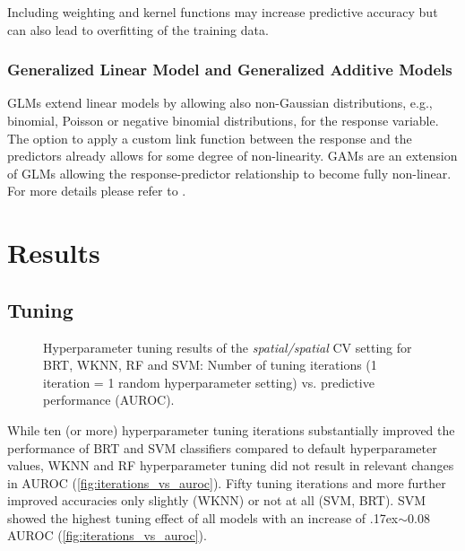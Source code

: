 \documentclass[review]{elsarticle}
\newcommand{\mytilde}{\raise.17ex\hbox{$\scriptstyle\mathtt{\sim}$}}
\begin{document}
Including weighting and kernel functions may increase predictive accuracy but can also lead to overfitting of the training data.

\subsubsection{Generalized Linear Model and Generalized Additive Models}

\label{subsec:gam}

\ac{GLM}s extend linear models by allowing also non-Gaussian distributions, e.g., binomial, Poisson or negative binomial distributions, for the response variable.
The option to apply a custom link function between the response and the predictors already allows for some degree of non-linearity.
\ac{GAM}s are an extension of \ac{GLM}s allowing the response-predictor relationship to become fully non-linear.
For more details please refer to \cite{Zuur2009, mgcv, James2013}.

\section{Results}

\subsection{Tuning}

\begin{figure} [t!]
	\begin{center}
		\caption[]{Hyperparameter tuning results of the \emph{spatial/spatial} CV setting for \ac{BRT}, \ac{WKNN}, \ac{RF} and \ac{SVM}: Number of tuning iterations (1 iteration = 1 random hyperparameter setting) vs. predictive performance (AUROC).}
		\label{fig:iterations_vs_auroc}
	\end{center}
\end{figure}


While ten (or more) hyperparameter tuning iterations substantially improved the performance of \ac{BRT} and \ac{SVM} classifiers compared to default hyperparameter values, \ac{WKNN} and \ac{RF} hyperparameter tuning did not result in relevant changes in AUROC (\autoref{fig:iterations_vs_auroc}).
Fifty tuning iterations and more further improved accuracies only slightly (\ac{WKNN}) or not at all (\ac{SVM}, \ac{BRT}).
\ac{SVM} showed the highest tuning effect of all models with an increase of \mytilde 0.08 AUROC (\autoref{fig:iterations_vs_auroc}).
\end{document}
